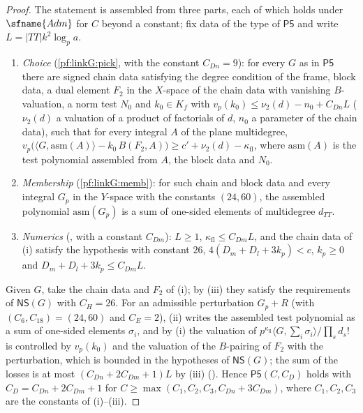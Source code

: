 \begin{proof}
The statement is assembled from three parts, each of which holds under $\sfname{Adm}$ for $C$ beyond a constant; fix data of
the type of $\mathsf{P5}$ and write $L=|TT|k^2\log_pa$.
\begin{enumerate}[label=(\roman*)]
\item \emph{Choice} (\cref{pf:linkG:pick}, with the constant $C_{Dn}=9$): for every $G$ as
in $\mathsf{P5}$ there are signed chain data satisfying the degree condition of the frame, block data, a dual element $F_2$
in the $X$-space of the chain data with vanishing $B$-valuation, a norm test $N_0$ and $k_0\in K_f$ with
$v_p(k_0)\le\nu_2(d)-n_0+C_{Dn}L$ ($\nu_2(d)$ a valuation of a product of factorials of $d$, $n_0$ a parameter of the chain
data), such that for every integral $A$ of the plane multidegree,
$v_p\bigl(\langle G,\mathrm{asm}(A)\rangle-k_0\,B(F_2,A)\bigr)\ge c'+\nu_2(d)-\kappa_{\mathrm{fl}}$, where $\mathrm{asm}(A)$ is the
test polynomial assembled from $A$, the block data and $N_0$.
\item \emph{Membership} (\cref{pf:linkG:memb}): for such chain and block data and
every integral $G_p$ in the $Y$-space with the constants $(24,60)$, the assembled polynomial $\mathrm{asm}(G_p)$ is a sum of
one-sided elements of multidegree $d_{TT}$.
\item \emph{Numerics} (, with a constant $C_{Dm}$): $L\ge1$,
$\kappa_{\mathrm{fl}}\le C_{Dm}L$, and the chain data of (i) satisfy the hypothesis with constant $26$, $4(D_m+D_l+3k_p)<c$,
$k_p\ge0$ and $D_m+D_l+3k_p\le C_{Dm}L$.
\end{enumerate}
Given $G$, take the chain data and $F_2$ of (i); by (iii) they satisfy the requirements of $\mathsf{NS}(G)$ with
$C_H=26$. For an admissible perturbation $G_p+R$ (with $(C_6,C_{18})=(24,60)$ and $C_E=2$), (ii) writes the assembled test
polynomial as a sum of one-sided elements $\sigma_i$, and by (i) the valuation of
$p^{\kappa_{\mathrm{fl}}}\langle G,\sum_i\sigma_i\rangle/\prod_sd_s!$ is controlled by $v_p(k_0)$ and the valuation of the
$B$-pairing of $F_2$ with the perturbation, which is bounded in the hypotheses of $\mathsf{NS}(G)$; the sum of the losses is at
most $(C_{Dn}+2C_{Dm}+1)L$ by (iii) (). Hence $\mathsf{P5}(C,C_D)$
holds with $C_D=C_{Dn}+2C_{Dm}+1$ for $C\ge\max(C_1,C_2,C_3,C_{Dn}+3C_{Dm})$, where $C_1,C_2,C_3$ are the constants of
(i)--(iii).
\end{proof}

